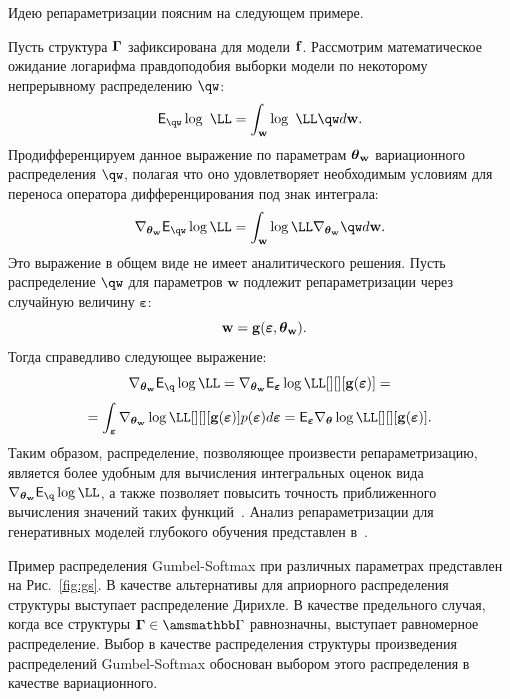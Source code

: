 Идею репараметризации поясним на следующем примере.
\begin{example} Пусть структура $\boldsymbol{\Gamma}$ зафиксирована для модели $\mathbf{f}$. Рассмотрим математическое ожидание логарифма правдоподобия выборки модели по некоторому непрерывному распределению $\qw$:
\[
    \E_{\qw} \log~\LL=  \int_{\w} \log~\LL \qw d\w.
\]
Продифференцируем данное выражение по параметрам $\boldsymbol{\theta}_\mathbf{w}$ вариационного распределения $\qw$, полагая что оно удовлетворяет необходимым условиям для переноса оператора дифференцирования под знак интеграла:
\[
    \nabla_{\tetaw} \E_{\qw} \log \LL = 
\int_{\w}  \log \LL \nabla_{\tetaw}\qw d\w.
\]
Это выражение в общем виде не имеет аналитического решения. Пусть распределение $\qw$ для параметров $\mathbf{w}$ подлежит репараметризации через случайную величину $\boldsymbol{\varepsilon}$:
\[
    \w = \mathbf{g}(\boldsymbol{\varepsilon}, \tetaw).
\] 
Тогда справедливо следующее выражение:
\[
 \nabla_{\tetaw} \E_{\q} \log \LL = \nabla_{\tetaw} \E_{\boldsymbol{\varepsilon}} \log \LL [][][\mathbf{g}(\boldsymbol{\varepsilon})] =
\]
\[= \int_{\boldsymbol{\varepsilon}}\nabla_{\tetaw} \log\LL [][][\mathbf{g}(\boldsymbol{\varepsilon})] p(\boldsymbol{\varepsilon}) d\boldsymbol{\varepsilon}=\E_{\boldsymbol{\varepsilon}} \nabla_{\teta} \log\LL [][][\mathbf{g}(\boldsymbol{\varepsilon})].\]
Таким образом, распределение, позволяющее произвести репараметризацию, является более удобным для вычисления интегральных оценок вида $ \nabla_{\tetaw} \E_{\q} \log \LL$, а также позволяет повысить точность приближенного вычисления значений таких функций~\cite{reparametrization}.
Анализ репараметризации для генеративных моделей глубокого обучения представлен в~\cite{reparametrization_blog}.
\end{example}

Пример распределения Gumbel-Softmax при различных параметрах представлен на Рис.~\ref{fig:gs}. В качестве альтернативы для априорного распределения структуры выступает  распределение Дирихле. В качестве предельного случая, когда все структуры $\G \in \Gb$ равнозначны, выступает равномерное распределение. Выбор в качестве распределения структуры произведения распределений Gumbel-Softmax  обоснован выбором этого распределения в качестве вариационного. 

